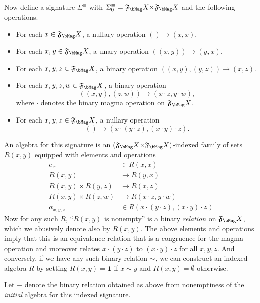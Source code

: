 \documentclass{book}
\def\sig{\Sigma}
\def\equivsym{\mathord{\equiv}}
\newcommand{\F}[1]{\mathfrak{F}_{#1}}
\def\unit{\mathbf{1}}
\begin{document}
Now define a signature $\sig^{\equivsym}$ with $\sig^{\equivsym}_0 = \F\bMag X\times \F\bMag X$ and the following operations.
\begin{itemize}
\item For each $x\in \F\bMag X$, a nullary operation $() \to (x,x)$.
\item For each $x,y\in \F\bMag X$, a unary operation $((x,y)) \to (y,x)$.
\item For each $x,y,z\in \F\bMag X$, a binary operation $((x,y),(y,z)) \to (x,z)$.
\item For each $x,y,z,w\in \F\bMag X$, a binary operation \[((x,y),(z,w)) \to (x\cdot z,y\cdot w),\] where $\cdot$ denotes the binary magma operation on $\F\bMag X$.
\item For each $x,y,z\in \F\bMag X$, a nullary operation \[() \to (x\cdot (y\cdot z),(x\cdot y)\cdot z).\]
\end{itemize}
An algebra for this signature is an $(\F\bMag X\times \F\bMag X)$-indexed family of sets $R(x,y)$ equipped with elements and operations
\begin{align*}
  e_x &\in R(x,x)\\
  R(x,y) &\to R(y,x)\\
  R(x,y)\times R(y,z) &\to R(x,z)\\
  R(x,y) \times R(z,w) &\to R(x\cdot z,y\cdot w)\\
  a_{x,y,z} &\in R(x\cdot (y\cdot z),(x\cdot y)\cdot z)
\end{align*}
Now for any such $R$, ``$R(x,y)$ is nonempty'' is a binary \emph{relation} on $\F\bMag X$, which we abusively denote also by $R(x,y)$.
The above elements and operations imply that this is an equivalence relation that is a congruence for the magma operation and moreover relates $x\cdot (y\cdot z)$ to $(x\cdot y)\cdot z$ for all $x,y,z$.
And conversely, if we have any such binary relation $\sim$, we can construct an indexed algebra $R$ by setting $R(x,y) = \unit$ if $x\sim y$ and $R(x,y)=\emptyset$ otherwise.

Let $\equivsym$ denote the binary relation obtained as above from nonemptiness of the \emph{initial} algebra for this indexed signature.
\end{document}
